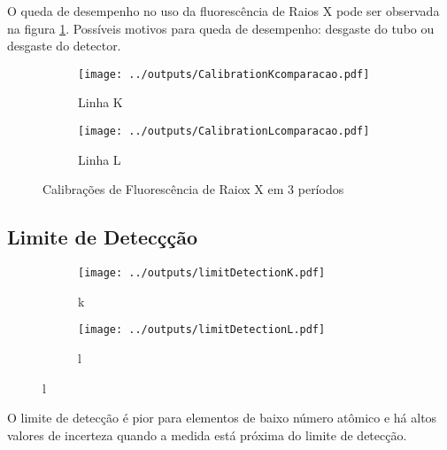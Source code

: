 O queda de desempenho no uso da fluorescência de Raios X pode ser observada 
na figura \ref{fig:compara_calibracao}. 
Possíveis motivos para queda de desempenho: desgaste do tubo ou desgaste do detector. 

\begin{figure}[H]
  \begin{subfigure}[b]{0.5\textwidth}
    \texttt{[image: ../outputs/CalibrationKcomparacao.pdf]}
    \caption{Linha K}
  \end{subfigure}%
  \begin{subfigure}[b]{0.5\textwidth}
    \texttt{[image: ../outputs/CalibrationLcomparacao.pdf]}
    \caption{Linha L}
  \end{subfigure}
  \caption{Calibrações de Fluorescência de Raiox X em 3 períodos \label{fig:compara_calibracao}}
\end{figure}

\subsection{Limite de Detecçção}

\begin{figure}[H]
  \caption{}
  \begin{subfigure}[b]{0.5\textwidth}
    \texttt{[image: ../outputs/limitDetectionK.pdf]}
    \caption{k}
  \end{subfigure}%
  \begin{subfigure}[b]{0.5\textwidth}
    \texttt{[image: ../outputs/limitDetectionL.pdf]}
    \caption{l}
  \end{subfigure}
\end{figure}

O limite de detecção é pior para elementos de baixo número atômico e há
altos valores de incerteza quando a medida está próxima do limite de detecção.
